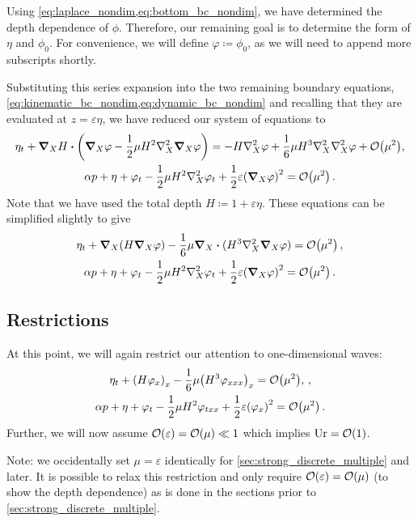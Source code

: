 \documentclass{jfm}
\let\Oldsubsection\subsection
\renewcommand{\subsection}{\FloatBarrier\Oldsubsection}
\DeclareMathOperator{\Ur}{Ur}
\renewcommand*{\epsilon}{\varepsilon}
\begin{document}
Using \cref{eq:laplace_nondim,eq:bottom_bc_nondim}, we have determined
the depth dependence of $\phi$.
Therefore, our remaining goal is to determine the form of $\eta$ and
$\phi_0$.
For convenience, we will define $\varphi \coloneqq \phi_0$, as we will
need to append more subscripts shortly.

Substituting this series expansion into the two
remaining boundary equations,
\cref{eq:kinematic_bc_nondim,eq:dynamic_bc_nondim} and recalling that
they are evaluated at $z=\epsilon \eta$, we have reduced our system of
equations to
\begin{gather}
  \eta_t + \grad_X{H}\vdot\pqty{\grad_X\varphi
    -\frac{1}{2}\mu H^2\laplacian_X\grad_X\varphi} =
    -H\laplacian_X\varphi
  +\frac{1}{6}\mu H^3\laplacian_X\laplacian_X\varphi +
    \order{\mu^2}, \\
  \alpha p + \eta + \varphi_{t} - \frac{1}{2}\mu
    H^2\laplacian_X\varphi_{t} + \frac{1}{2}\epsilon
    \pqty{\grad_X\varphi}^2 = \order{\mu^2} \,.
\end{gather}
Note that we have used the total depth $H\coloneqq 1+\epsilon\eta$.
These equations can be simplified slightly to give
\begin{gather}
  \eta_t + \grad_X(H\grad_X\varphi)
    -\frac{1}{6}\mu \grad_X\vdot(H^3\laplacian_X\grad_X\varphi) =
    \order{\mu^2} \,, \\
  \alpha p + \eta + \varphi_{t} - \frac{1}{2}\mu
    H^2\laplacian_X\varphi_{t} +
    \frac{1}{2}\epsilon\pqty{\grad_X\varphi}^2 = \order{\mu^2} \,.
\end{gather}

\subsection{Restrictions}
At this point, we will again restrict our attention to one-dimensional
waves:
\begin{gather}
  \eta_t + \pqty{H\varphi_x}_x
    -\frac{1}{6}\mu \pqty{H^3\varphi_{xxx}}_x =
    \order{\mu^2}, \label{eq:kinematic_bc_varphi} \,, \\
  \alpha p +\eta + \varphi_t - \frac{1}{2}\mu H^2\varphi_{txx} +
    \frac{1}{2}\epsilon\pqty{\varphi_x}^2 = \order{\mu^2} \,.
  \label{eq:dynamic_bc_varphi}
\end{gather}
Further, we will now assume $\order{\epsilon} = \order{\mu} \ll 1$ which
implies $\Ur = \order{1}$.

Note: we occidentally set $\mu=\epsilon$ identically for
\cref{sec:strong_discrete_multiple} and later.
It is possible to relax this restriction and only require
$\order{\epsilon} = \order{\mu}$ (to show the depth dependence) as is
done in the sections prior to \cref{sec:strong_discrete_multiple}.
\end{document}
